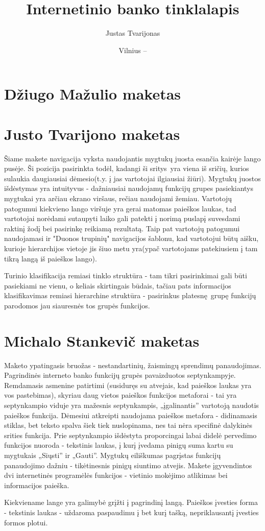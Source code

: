 \documentclass{VUMIFPSkursinis}
\title{Internetinio banko tinklalapis}
\author{Justas Tvarijonas}
\date{Vilnius – \the\year}
\begin{document}
\maketitle
\tableofcontents
\section{Džiugo Mažulio maketas}
\section{Justo Tvarijono maketas}
Šiame makete navigacija vyksta naudojantis mygtukų juosta esančia kairėje lango pusėje. Ši pozicija pasirinkta todėl, kadangi ši sritys yra viena iš sričių, kurios sulaukia daugiausiai dėmesio(t.y. į jas vartotojai ilgiausiai žiūri). Mygtukų juostos išdėstymas yra intuityvus - dažniausiai naudojamų funkcijų grupes pasiekiantys mygtukai yra arčiau ekrano viršaus, rečiau naudojami žemiau. Vartotojų patogumui kiekvieno lango viršuje yra gerai matomas paieškos laukas, tad vartotojai norėdami sutaupyti laiko gali patekti į norimą puslapį suvesdami raktinį žodį bei pasirinkę reikiamą rezultatą. Taip pat vartotojų patogumui naudojamasi ir "Duonos trupinių" navigacijos šablonu, kad vartotojui būtų aišku, kurioje hierarchijos vietoje jis šiuo metu yra(ypač vartotojams patekiusiem į tam tikrą langą iš paieškos lango). \par Turinio klasifikacija remiasi tinklo struktūra - tam tikri pasirinkimai gali būti pasiekiami ne vienu, o keliais skirtingais būdais, tačiau pats informacijos klasifikavimas remiasi hierarchine struktūra - pasirinkus platesnę grupę funkcijų parodomos jau siauresnės tos grupės funkcijos.

\section{Michalo Stankevič maketas}
Maketo ypatingasis bruožas - nestandartinių, žaismingų sprendimų panaudojimas. Pagrindinės interneto banko funkcijų grupės pavaizduotos septynkampyje. Remdamasis asmenine patirtimi (susiduręs su atvejais, kad paieškos laukas yra vos pastebimas), skyriau daug vietos paieškos funkcijos metaforai - tai yra septynkampio viduje yra mažesnis septynkampis, „įgalinantis” vartotoją naudotis paieškos funkcija. Dėmesiui atkreipti naudojama paieškos metafora - didinamasis stiklas, bet teksto spalva šiek tiek nuslopinama, nes tai nėra specifinė dalykinės srities funkcija. Prie septynkampio išdėstyta proporcingai labai didelė pervedimo funkcijos nuoroda - tekstinis laukas, į kurį įvedama pinigų suma kartu su mygtukais „Siųsti” ir „Gauti”. Mygtukų eiliškumas pagrįstas funkcijų panaudojimo dažniu - tikėtinesnis pinigų siuntimo atvejis.
Makete įgyvendintos dvi internetinės programėlės funkcijos - vietinio mokėjimo atlikimas bei informacijos paieška. \par
Kiekviename lange yra galimybė grįžti į pagrindinį langą. Paieškos įvesties forma - tekstinis laukas - uždaroma paspaudimu į bet kurį tašką, nepriklausantį įvesties formos plotui.
\end{document}
